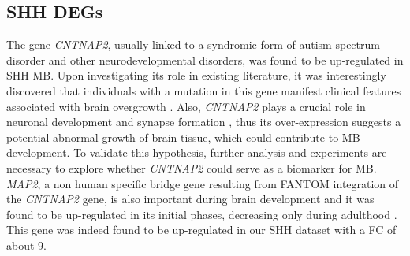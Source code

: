 \documentclass[10pt]{SelfArx} %
\begin{document}
\subsection{SHH DEGs}\label{sec:SHH_DE}
The gene \textit{CNTNAP2}, usually linked to a syndromic form of autism spectrum disorder and other neurodevelopmental disorders, was found to be up-regulated in SHH MB. Upon investigating its role in existing literature, it was interestingly discovered that individuals with a mutation in this gene manifest clinical features associated with brain overgrowth \cite{de2021cortical}. Also, \textit{CNTNAP2} plays a crucial role in neuronal development and synapse formation \cite{st2022role}, thus its over-expression suggests a potential abnormal growth of brain tissue, which could contribute to MB development. To validate this hypothesis, further analysis and experiments are necessary to explore whether \textit{CNTNAP2} could serve as a biomarker for MB. \\
\textit{MAP2}, a non human specific bridge gene resulting from FANTOM \cite{fantom5} integration of the \textit{CNTNAP2} gene, is also important during brain development and it was found to be up-regulated in its initial phases, decreasing only during adulthood \cite{safaei1989regulation}. This gene was indeed found to be up-regulated in our SHH dataset with a FC of about 9. \\
\end{document}
